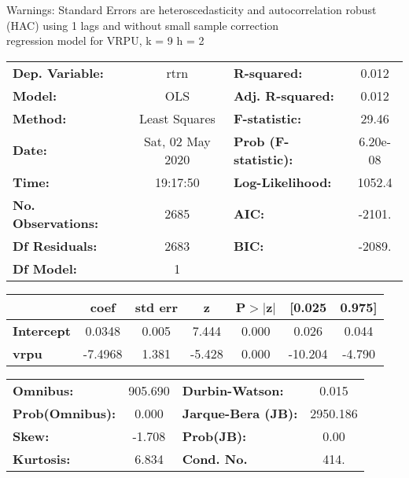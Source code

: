 Warnings: \newline
 [1] Standard Errors are heteroscedasticity and autocorrelation robust (HAC) using 1 lags and without small sample correction\\ 

regression model for VRPU, k = 9 h = 2\begin{center}
\begin{tabular}{lclc}
\toprule
\textbf{Dep. Variable:}    &       rtrn       & \textbf{  R-squared:         } &     0.012   \\
\textbf{Model:}            &       OLS        & \textbf{  Adj. R-squared:    } &     0.012   \\
\textbf{Method:}           &  Least Squares   & \textbf{  F-statistic:       } &     29.46   \\
\textbf{Date:}             & Sat, 02 May 2020 & \textbf{  Prob (F-statistic):} &  6.20e-08   \\
\textbf{Time:}             &     19:17:50     & \textbf{  Log-Likelihood:    } &    1052.4   \\
\textbf{No. Observations:} &        2685      & \textbf{  AIC:               } &    -2101.   \\
\textbf{Df Residuals:}     &        2683      & \textbf{  BIC:               } &    -2089.   \\
\textbf{Df Model:}         &           1      & \textbf{                     } &             \\
\bottomrule
\end{tabular}
\begin{tabular}{lcccccc}
                   & \textbf{coef} & \textbf{std err} & \textbf{z} & \textbf{P$> |$z$|$} & \textbf{[0.025} & \textbf{0.975]}  \\
\midrule
\textbf{Intercept} &       0.0348  &        0.005     &     7.444  &         0.000        &        0.026    &        0.044     \\
\textbf{vrpu}      &      -7.4968  &        1.381     &    -5.428  &         0.000        &      -10.204    &       -4.790     \\
\bottomrule
\end{tabular}
\begin{tabular}{lclc}
\textbf{Omnibus:}       & 905.690 & \textbf{  Durbin-Watson:     } &    0.015  \\
\textbf{Prob(Omnibus):} &   0.000 & \textbf{  Jarque-Bera (JB):  } & 2950.186  \\
\textbf{Skew:}          &  -1.708 & \textbf{  Prob(JB):          } &     0.00  \\
\textbf{Kurtosis:}      &   6.834 & \textbf{  Cond. No.          } &     414.  \\
\bottomrule
\end{tabular}
\end{center}

